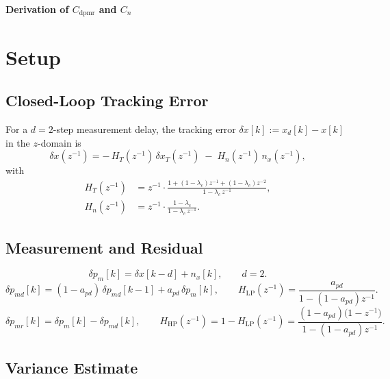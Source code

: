 \documentclass[11pt,a4paper]{ctexart}
\newcommand{\lc}{\lambda_c}
\newcommand{\dx}{\delta x}
\newcommand{\dxT}{\delta x_{T}}
\newcommand{\nx}{n_{x}}
\newcommand{\dpm}{\delta p_{m}}
\newcommand{\dpmd}{\delta p_{md}}
\newcommand{\dpmr}{\delta p_{mr}}
\newcommand{\HT}{H_{T}}
\newcommand{\Hn}{H_{n}}
\newcommand{\HHP}{H_{\mathrm{HP}}}
\newcommand{\HLP}{H_{\mathrm{LP}}}
\newcommand{\Cdpmr}{C_{\mathrm{dpmr}}}
\newcommand{\Cn}{C_{n}}
\newcommand{\apd}{a_{pd}}
\begin{document}
\thispagestyle{empty}

\begin{center}
{\Large\bfseries Derivation of $\Cdpmr$ and $\Cn$}
\end{center}
\vspace{0.3cm}

\section{Setup}

\subsection{Closed-Loop Tracking Error}

For a $d{=}2$-step measurement delay, the tracking error $\dx[k] := x_d[k] - x[k]$ in the $z$-domain is
\begin{equation}
\dx(z^{-1}) = -\,\HT(z^{-1})\,\dxT(z^{-1}) \;-\; \Hn(z^{-1})\,\nx(z^{-1}),
\label{eq:paper-dx}
\end{equation}
with
\begin{align}
\HT(z^{-1}) &= z^{-1}\cdot\frac{1+(1{-}\lc)z^{-1}+(1{-}\lc)z^{-2}}{1-\lc\,z^{-1}}, \label{eq:HT}\\[2pt]
\Hn(z^{-1}) &= z^{-1}\cdot\frac{1{-}\lc}{1-\lc\,z^{-1}}. \label{eq:Hn}
\end{align}

\subsection{Measurement and Residual}

\begin{equation}
\dpm[k] = \dx[k-d] + \nx[k], \qquad d=2.
\label{eq:dpm}
\end{equation}
\begin{equation}
\dpmd[k] = (1-\apd)\,\dpmd[k-1] + \apd\,\dpm[k],
\qquad
\HLP(z^{-1}) = \frac{\apd}{1-(1-\apd)z^{-1}}.
\label{eq:LP}
\end{equation}
\begin{equation}
\dpmr[k] = \dpm[k] - \dpmd[k],
\qquad
\HHP(z^{-1}) = 1 - \HLP(z^{-1}) = \frac{(1-\apd)\bigl(1-z^{-1}\bigr)}{1-(1-\apd)z^{-1}}.
\label{eq:HP}
\end{equation}

\subsection{Variance Estimate}
\end{document}
